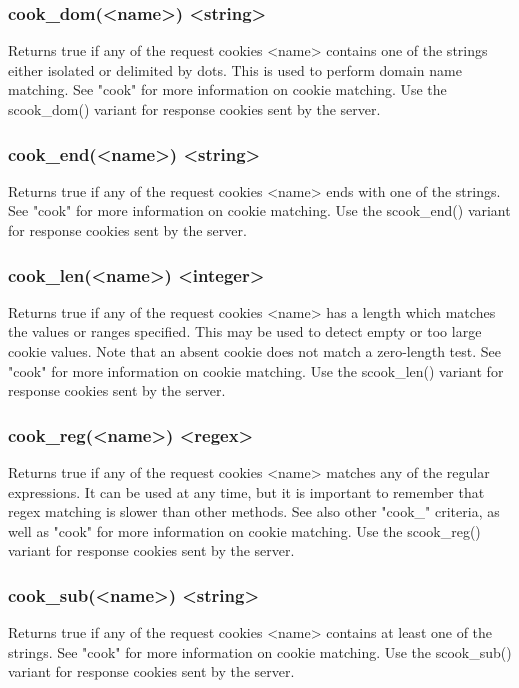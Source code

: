 \subsubsection[cook\_dom]{cook\_dom(<name>) <string>}
  Returns true if any of the request cookies <name> contains one of the strings
  either isolated or delimited by dots. This is used to perform domain name
  matching. See "cook" for more information on cookie matching. Use the
  scook\_dom() variant for response cookies sent by the server.

\subsubsection[cook\_end]{cook\_end(<name>) <string>}
  Returns true if any of the request cookies <name> ends with one of the
  strings. See "cook" for more information on cookie matching. Use the
  scook\_end() variant for response cookies sent by the server.

\subsubsection[cook\_len]{cook\_len(<name>) <integer>}
  Returns true if any of the request cookies <name> has a length which matches
  the values or ranges specified. This may be used to detect empty or too large
  cookie values. Note that an absent cookie does not match a zero-length test.
  See "cook" for more information on cookie matching. Use the scook\_len()
  variant for response cookies sent by the server.

\subsubsection[cook\_reg]{cook\_reg(<name>) <regex>}
  Returns true if any of the request cookies <name> matches any of the regular
  expressions. It can be used at any time, but it is important to remember that
  regex matching is slower than other methods. See also other "cook\_" criteria,
  as well as "cook" for more information on cookie matching. Use the
  scook\_reg() variant for response cookies sent by the server.

\subsubsection[cook\_sub]{cook\_sub(<name>) <string>}
  Returns true if any of the request cookies <name> contains at least one of
  the strings. See "cook" for more information on cookie matching. Use the
  scook\_sub() variant for response cookies sent by the server.

